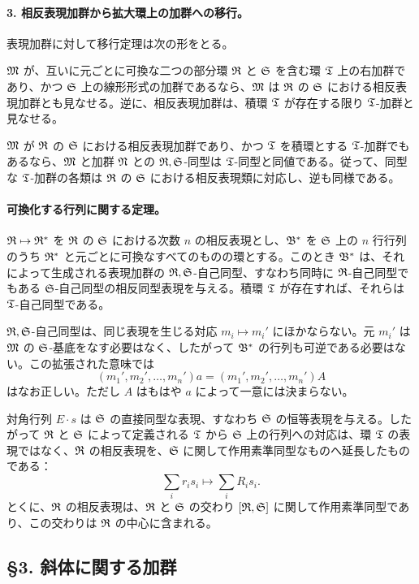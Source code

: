\paragraph{3. 相反表現加群から拡大環上の加群への移行。}
表現加群に対して移行定理は次の形をとる。

\(\mathfrak M\) が、互いに元ごとに可換な二つの部分環 \(\mathfrak R\) と \(\mathfrak S\) を含む環 \(\mathfrak T\) 上の右加群であり、かつ \(\mathfrak S\) 上の線形形式の加群であるなら、\(\mathfrak M\) は \(\mathfrak R\) の \(\mathfrak S\) における相反表現加群とも見なせる。逆に、相反表現加群は、積環 \(\mathfrak T\) が存在する限り \(\mathfrak T\)-加群と見なせる。

\(\mathfrak M\) が \(\mathfrak R\) の \(\mathfrak S\) における相反表現加群であり、かつ \(\mathfrak T\) を積環とする \(\mathfrak T\)-加群でもあるなら、\(\mathfrak M\) と加群 \(\mathfrak N\) との \(\mathfrak R,\mathfrak S\)-同型は \(\mathfrak T\)-同型と同値である。従って、同型な \(\mathfrak T\)-加群の各類は \(\mathfrak R\) の \(\mathfrak S\) における相反表現類に対応し、逆も同様である。

\paragraph{可換化する行列に関する定理。}
\(\mathfrak R\mapsto\mathfrak R^*\) を \(\mathfrak R\) の \(\mathfrak S\) における次数 \(n\) の相反表現とし、\(\mathfrak B^*\) を \(\mathfrak S\) 上の \(n\) 行行列のうち \(\mathfrak R^*\) と元ごとに可換なすべてのものの環とする。このとき \(\mathfrak B^*\) は、それによって生成される表現加群の \(\mathfrak R,\mathfrak S\)-自己同型、すなわち同時に \(\mathfrak R\)-自己同型でもある \(\mathfrak S\)-自己同型の相反同型表現を与える。積環 \(\mathfrak T\) が存在すれば、それらは \(\mathfrak T\)-自己同型である。

\(\mathfrak R,\mathfrak S\)-自己同型は、同じ表現を生じる対応 \(m_i\mapsto m_i'\) にほかならない。元 \(m_i'\) は \(\mathfrak M\) の \(\mathfrak S\)-基底をなす必要はなく、したがって \(\mathfrak B^*\) の行列も可逆である必要はない。この拡張された意味では
\[
        (m_1',m_2',\ldots,m_n')a=(m_1',m_2',\ldots,m_n')A
\]
はなお正しい。ただし \(A\) はもはや \(a\) によって一意には決まらない。

対角行列 \(E\cdot s\) は \(\mathfrak S\) の直接同型な表現、すなわち \(\mathfrak S\) の恒等表現を与える。したがって \(\mathfrak R\) と \(\mathfrak S\) によって定義される \(\mathfrak T\) から \(\mathfrak S\) 上の行列への対応は、環 \(\mathfrak T\) の表現ではなく、\(\mathfrak R\) の相反表現を、\(\mathfrak S\) に関して作用素準同型なものへ延長したものである：
\[
        \sum_i r_i s_i\longmapsto \sum_i R_i s_i.
\]
とくに、\(\mathfrak R\) の相反表現は、\(\mathfrak R\) と \(\mathfrak S\) の交わり \([\mathfrak R,\mathfrak S]\) に関して作用素準同型であり、この交わりは \(\mathfrak R\) の中心に含まれる。

\subsection*{§3. 斜体に関する加群}

